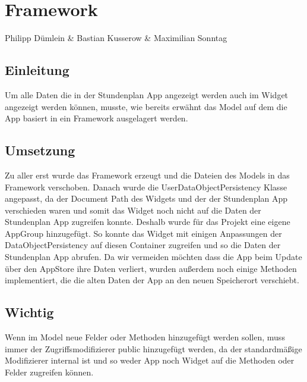 \chapter{Framework}
Philipp Dümlein \& Bastian Kusserow \& Maximilian Sonntag

\section{Einleitung}
Um alle Daten die in der Stundenplan App angezeigt werden auch im Widget angezeigt werden können, musste, wie bereits erwähnt das Model auf dem die App basiert in ein Framework ausgelagert werden.

\section{Umsetzung}
Zu aller erst wurde das Framework erzeugt und die Dateien des Models in das Framework verschoben.
Danach wurde die UserDataObjectPersistency Klasse angepasst, da der Document Path des Widgets und der der Stundenplan App verschieden waren und somit das Widget noch nicht auf die Daten der Stundenplan App zugreifen konnte. Deshalb wurde für das Projekt eine eigene AppGroup hinzugefügt. So konnte das Widget mit einigen Anpassungen der DataObjectPersistency auf diesen Container zugreifen und so die Daten der Stundenplan App abrufen.
Da wir vermeiden möchten dass die App beim Update über den AppStore ihre Daten verliert, wurden außerdem noch einige Methoden implementiert, die die alten Daten der App an den neuen Speicherort verschiebt.

\section{Wichtig}
Wenn im Model neue Felder oder Methoden hinzugefügt werden sollen, muss immer der Zugriffsmodifizierer public hinzugefügt werden, da der standardmäßige Modifizierer internal ist und so weder App noch Widget auf die Methoden oder Felder zugreifen können.